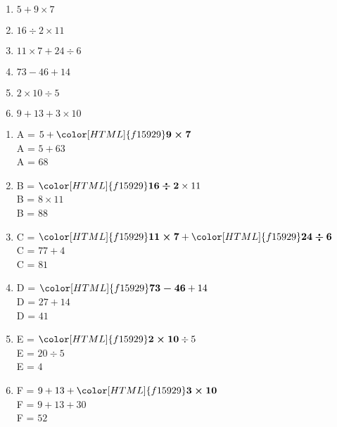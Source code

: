 \begin{exercice*}
   \begin{multicols}{2}
      \begin{enumerate}
         \item $5+9\times7$
         \item $16\div2\times11$
         \item $11\times7+24\div6$
         \item $73-46+14$
         \item $2\times10\div5$
         \item $9+13+3\times10$
      \end{enumerate}
   \end{multicols}
\end{exercice*}
\begin{corrige}
   \begin{enumerate}
      \item A = $5+{\color[HTML]{f15929}\boldsymbol{9\times7}}$ \\A = $5+63$ \\A = $68$ \\
      \item B = ${\color[HTML]{f15929}\boldsymbol{16\div2}}\times11$ \\B = $8\times11$ \\B = $88$ \\
      \item C = ${\color[HTML]{f15929}\boldsymbol{11\times7}}+{\color[HTML]{f15929}\boldsymbol{24\div6}}$ \\C = $77+4$ \\C = $81$ \\
      \item D = ${\color[HTML]{f15929}\boldsymbol{73-46}}+14$ \\D = $27+14$ \\D = $41$ \\
      \item E = ${\color[HTML]{f15929}\boldsymbol{2\times10}}\div5$ \\E = $20\div5$ \\E = $4$ \\
      \item F = $9+13+{\color[HTML]{f15929}\boldsymbol{3\times10}}$ \\F = $9+13+30$ \\F = $52$ \\
   \end{enumerate}
\end{corrige}
 